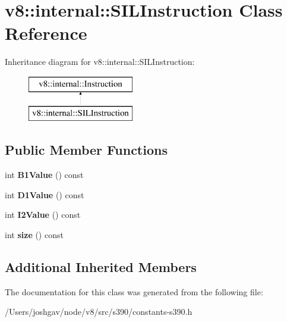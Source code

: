 \hypertarget{classv8_1_1internal_1_1_s_i_l_instruction}{}\section{v8\+:\+:internal\+:\+:S\+I\+L\+Instruction Class Reference}
\label{classv8_1_1internal_1_1_s_i_l_instruction}
Inheritance diagram for v8\+:\+:internal\+:\+:S\+I\+L\+Instruction\+:\begin{figure}[H]
\begin{center}
\leavevmode
\includegraphics[height=2.000000cm]{classv8_1_1internal_1_1_s_i_l_instruction}
\end{center}
\end{figure}
\subsection*{Public Member Functions}
\begin{DoxyCompactItemize}
\item 
int {\bfseries B1\+Value} () const \hypertarget{classv8_1_1internal_1_1_s_i_l_instruction_ad7bc57034e4f39fb5c0eec6ab986910c}{}\label{classv8_1_1internal_1_1_s_i_l_instruction_ad7bc57034e4f39fb5c0eec6ab986910c}

\item 
int {\bfseries D1\+Value} () const \hypertarget{classv8_1_1internal_1_1_s_i_l_instruction_a09eba395b05381bd2da9cd4bb8df3ec8}{}\label{classv8_1_1internal_1_1_s_i_l_instruction_a09eba395b05381bd2da9cd4bb8df3ec8}

\item 
int {\bfseries I2\+Value} () const \hypertarget{classv8_1_1internal_1_1_s_i_l_instruction_ade9da7672336025e85eaab895af73a21}{}\label{classv8_1_1internal_1_1_s_i_l_instruction_ade9da7672336025e85eaab895af73a21}

\item 
int {\bfseries size} () const \hypertarget{classv8_1_1internal_1_1_s_i_l_instruction_ab95af94d2b3f095520492d2da91d81d7}{}\label{classv8_1_1internal_1_1_s_i_l_instruction_ab95af94d2b3f095520492d2da91d81d7}

\end{DoxyCompactItemize}
\subsection*{Additional Inherited Members}


The documentation for this class was generated from the following file\+:\begin{DoxyCompactItemize}
\item 
/\+Users/joshgav/node/v8/src/s390/constants-\/s390.\+h\end{DoxyCompactItemize}

